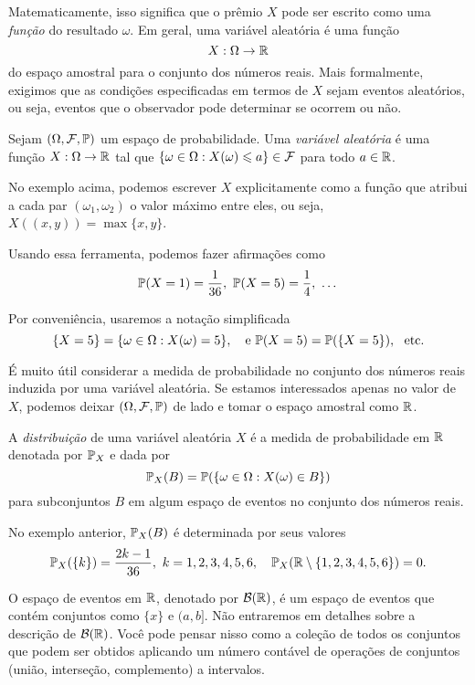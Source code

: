 Matematicamente, isso significa que o prêmio $ X $ pode ser escrito como uma \emph{função} do resultado $ \omega $.
Em geral, uma variável aleatória é uma função
\[
X : \Omega \to \mathbb{R}
\]
do espaço amostral para o conjunto dos números reais.
Mais formalmente, exigimos que as condições especificadas em termos de $ X $ sejam eventos aleatórios, ou seja, eventos que o observador pode determinar se ocorrem ou não.

\begin{definition}
Sejam $ (\Omega,\mathcal F,\mathbb{P}) $ um espaço de probabilidade.
Uma \emph{variável aleatória} é uma função $ X : \Omega \to \mathbb{R} $
tal que $ \{ \omega\in\Omega:X(\omega) \leqslant a \} \in \mathcal F $ para todo $ a \in \mathbb{R} $.
\end{definition}

No exemplo acima, podemos escrever $ X $ explicitamente como a função que atribui a cada par $ (\omega_1, \omega_2) $ o valor máximo entre eles, ou seja, $ X((x,y)) = \max\{x,y\} $.

Usando essa ferramenta, podemos fazer afirmações como
\[
\mathbb{P}(X=1) = \frac{1}{36}, \ \mathbb{P}(X=5)=\frac{1}{4}, \ \dots
\]

\begin{notation*}
Por conveniência, usaremos a notação simplificada
\[
\{X = 5\} = \{\omega\in\Omega:X(\omega)=5\}
,
\
\
\text{ e }
\mathbb{P}(X=5) = \mathbb{P}(\{X=5\})
,
\
\
\text{etc.}
\]
\end{notation*}

É muito útil considerar a medida de probabilidade no conjunto dos números reais induzida por uma variável aleatória.
Se estamos interessados apenas no valor de $ X $, podemos deixar $ (\Omega,\mathcal F,\mathbb{P}) $ de lado e tomar o espaço amostral como $ \mathbb{R} $.

\begin{definition}
[Distribuição]
A \emph{distribuição} de uma variável aleatória $ X $ é a medida de probabilidade em $ \mathbb{R} $ denotada por $ \mathbb{P}_X $ e dada por
\[
\mathbb{P}_X(B) = \mathbb{P}(\{\omega\in\Omega:X(\omega)\in B\})
\]
para subconjuntos $ B $ em algum espaço de eventos no conjunto dos números reais.
\end{definition}

No exemplo anterior, $ \mathbb{P}_X(B) $ é determinada por seus valores
\[
\mathbb{P}_X(\{k\}) = \frac{2k-1}{36}, \ k=1,2,3,4,5,6,
\quad
\mathbb{P}_X(\mathbb{R}\setminus \{1,2,3,4,5,6\})=0
.
\]

\begin{notation*}
O espaço de eventos em $ \mathbb{R} $, denotado por $ \mathcal B(\mathbb{R}) $, é um espaço de eventos que contém conjuntos como $ \{x\} $ e $ (a,b] $.
Não entraremos em detalhes sobre a descrição de $ \mathcal B(\mathbb{R}) $.
Você pode pensar nisso como a coleção de todos os conjuntos que podem ser obtidos aplicando um número contável de operações de conjuntos (união, interseção, complemento) a intervalos.
\end{notation*}

